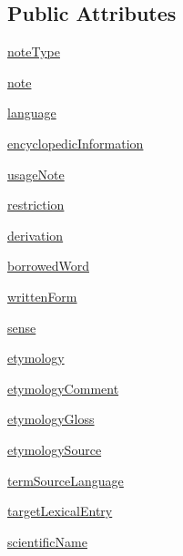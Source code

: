 \subsection*{Public Attributes}
\begin{DoxyCompactItemize}
\item 
\hyperlink{classsrc_1_1core_1_1statement_1_1_statement_a2cbc454e31333b14ed7f894df8af2fce}{note\+Type}
\item 
\hyperlink{classsrc_1_1core_1_1statement_1_1_statement_a2edc72dff8f04376c6f09fc9a270503b}{note}
\item 
\hyperlink{classsrc_1_1core_1_1statement_1_1_statement_a62916eea6e03f2115544f9fd6d8042fc}{language}
\item 
\hyperlink{classsrc_1_1core_1_1statement_1_1_statement_ac27bf20184c2fe3fc081af160a34b078}{encyclopedic\+Information}
\item 
\hyperlink{classsrc_1_1core_1_1statement_1_1_statement_afbcca36f7315bd8b556f31a6c73da2e8}{usage\+Note}
\item 
\hyperlink{classsrc_1_1core_1_1statement_1_1_statement_a95cc64760bb64c330e5dc921c00981c9}{restriction}
\item 
\hyperlink{classsrc_1_1core_1_1statement_1_1_statement_a43c11e8a1f1b8dcf1c47138630ce9014}{derivation}
\item 
\hyperlink{classsrc_1_1core_1_1statement_1_1_statement_ad335aefcefa9ae166c0cae1e553e2bf3}{borrowed\+Word}
\item 
\hyperlink{classsrc_1_1core_1_1statement_1_1_statement_a754fb4718f6f6a7999094cedb98716cb}{written\+Form}
\item 
\hyperlink{classsrc_1_1core_1_1statement_1_1_statement_aae184efd75880bebe51b7c8161ce0e81}{sense}
\item 
\hyperlink{classsrc_1_1core_1_1statement_1_1_statement_a39257f2e47ab775116eae335c871f30d}{etymology}
\item 
\hyperlink{classsrc_1_1core_1_1statement_1_1_statement_a75153a36438fe45f7b4c6da80dc2eb5b}{etymology\+Comment}
\item 
\hyperlink{classsrc_1_1core_1_1statement_1_1_statement_ac5b1ca26900e8f0d6407658195820157}{etymology\+Gloss}
\item 
\hyperlink{classsrc_1_1core_1_1statement_1_1_statement_afb34d7f04ad71ed5a0fe62932305f743}{etymology\+Source}
\item 
\hyperlink{classsrc_1_1core_1_1statement_1_1_statement_ab1bd16d721a81ebae7f1e0fb5da23d0f}{term\+Source\+Language}
\item 
\hyperlink{classsrc_1_1core_1_1statement_1_1_statement_a8ff06170be6b1b8856c0b2c78c458dac}{target\+Lexical\+Entry}
\item 
\hyperlink{classsrc_1_1core_1_1statement_1_1_statement_addc80054a840f2859f503389e53a247c}{scientific\+Name}
\end{DoxyCompactItemize}


